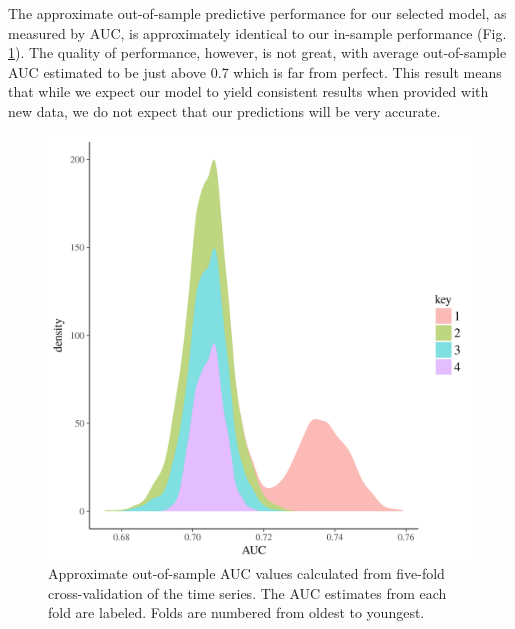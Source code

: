 \documentclass[12pt,letterpaper]{article}
\begin{document}
The approximate out-of-sample predictive performance for our selected model, as measured by AUC, is approximately identical to our in-sample performance (Fig. \ref{fig:fold_auc}). The quality of performance, however, is not great, with average out-of-sample AUC estimated to be just above 0.7 which is far from perfect. This result means that while we expect our model to yield consistent results when provided with new data, we do not expect that our predictions will be very accurate.
\begin{figure}[ht]
  \centering
  \includegraphics[width=\textwidth,height=0.5\textheight,keepaspectratio=true]{figure/fold_auc}
  \caption{Approximate out-of-sample AUC values calculated from five-fold cross-validation of the time series. The AUC estimates from each fold are labeled. Folds are numbered from oldest to youngest.}
  \label{fig:fold_auc}
\end{figure}

\end{document}
